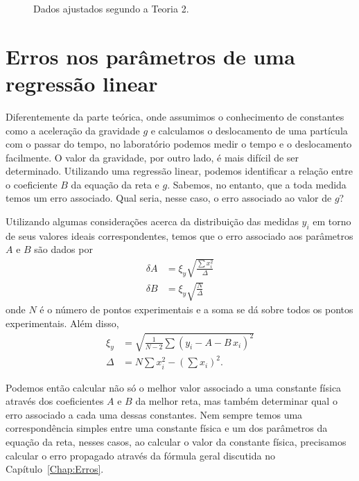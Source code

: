 \begin{figure}
\centering

\caption{Dados ajustados segundo a Teoria 2.\label{GraficoTeoria2}}
\end{figure}


\section{Erros nos parâmetros de uma regressão linear}
\label{Chap:ErrosCoefAB}

Diferentemente da parte teórica, onde assumimos o conhecimento de constantes como a aceleração da gravidade $g$ e calculamos o deslocamento de uma partícula com o passar do tempo, no laboratório podemos medir o tempo e o deslocamento facilmente. O valor da gravidade, por outro lado, é mais difícil de ser determinado. Utilizando uma regressão linear, podemos identificar a relação entre o coeficiente $B$ da equação da reta e $g$. Sabemos, no entanto, que a toda medida temos um erro associado. Qual seria, nesse caso, o erro associado ao valor de $g$? 

Utilizando algumas considerações\cite{Taylor} acerca da distribuição das medidas $y_i$ em torno de seus valores ideais correspondentes, temos que o erro associado aos parâmetros $A$ e $B$ são dados por
\begin{align}
	\delta A &= \xi_y\sqrt{\frac{\sum x_i^2}{\Delta}} \label{Eq:ErrosCoeficientesRegLinear1}\\
	\delta B &= \xi_y\sqrt{\frac{N}{\Delta}}
\end{align}
%
onde $N$ é o número de pontos experimentais e a soma se dá sobre todos os pontos experimentais. Além disso,
\begin{align}
	\xi_y &= \sqrt{\frac{1}{N-2}\sum(y_i-A-B\,x_i)^2} \\
	\Delta &= N\sum x_i^2 - \left(\sum x_i\right)^2. \label{Eq:ErrosCoeficientesRegLinear4}
\end{align}

Podemos então calcular não só o melhor valor associado a uma constante física através dos coeficientes $A$ e $B$ da melhor reta, mas também determinar qual o erro associado a cada uma dessas constantes. Nem sempre temos uma correspondência simples entre uma constante física e um dos parâmetros da equação da reta, nesses casos, ao calcular o valor da constante física, precisamos calcular o erro propagado através da fórmula geral discutida no Capítulo~\ref{Chap:Erros}.

